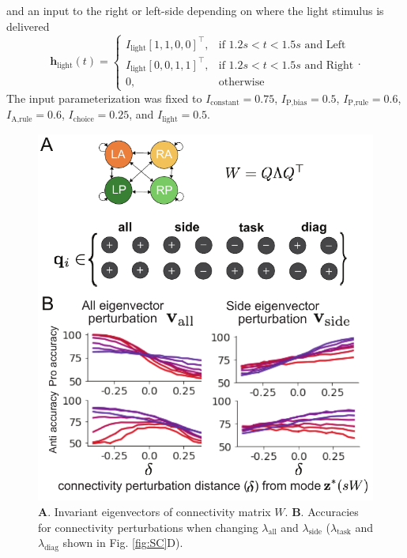 \documentclass[11pt]{article}
\begin{document}
and an input to the right or left-side depending on where the light stimulus is delivered    
\begin{equation}  \mathbf{h}_{\text{light}}(t) = \begin{cases}
                           I_{\text{light}} [1, 1, 0, 0]^\top,& \text{if } 1.2s < t < 1.5s \text{ and Left} \\
                           I_{\text{light}} [0, 0, 1, 1]^\top,& \text{if } 1.2s < t < 1.5s \text{ and Right} \\
                            0,              & \text{otherwise}
                         \end{cases}.
\end{equation}
The input parameterization was fixed to $I_{\text{constant}} = 0.75$, $I_{\text{P,bias}} = 0.5 $, $I_{\text{P,rule}} = 0.6$,  $I_{\text{A,rule}} = 0.6$,  $I_{\text{choice}} = 0.25$,  and $I_{\text{light}} = 0.5$.


\begin{figure}
\begin{center}
\includegraphics[scale=.9]{figures/figSC3/figSC3.pdf}
\end{center}
\caption{
\textbf{A}. Invariant eigenvectors of connectivity matrix $W$.
\textbf{B}. Accuracies for connectivity perturbations when changing $\lambda_{\text{all}}$ and $\lambda_{\text{side}}$ ($\lambda_{\text{task}}$ and $\lambda_{\text{diag}}$ shown in Fig. \ref{fig:SC}D).
}
\label{fig:SC3}
\end{figure}
\end{document}
